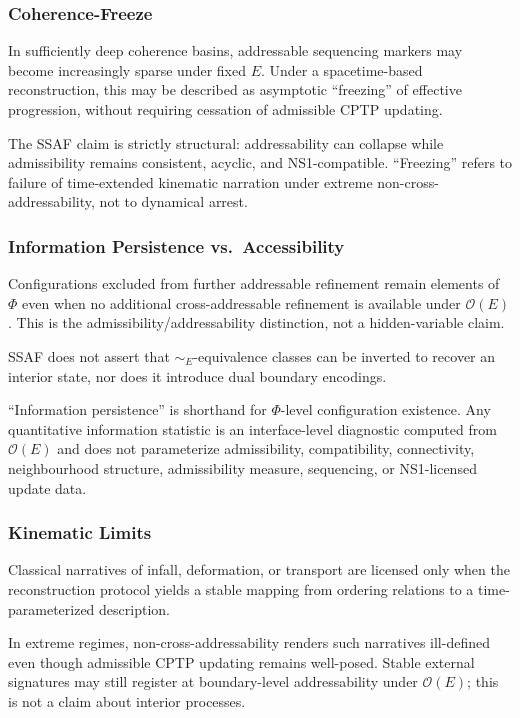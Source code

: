 \documentclass[aps,prx,onecolumn,11pt]{revtex4-2}
\theoremstyle{plain}
\theoremstyle{definition}
\theoremstyle{remark}
\begin{document}
\subsubsection{Coherence-Freeze}
\label{appB:coherence_freeze}

In sufficiently deep coherence basins, addressable sequencing markers
may become increasingly sparse under fixed \(E\). Under a spacetime-based
reconstruction, this may be described as asymptotic ``freezing'' of
effective progression, without requiring cessation of admissible CPTP
updating.

The SSAF claim is strictly structural: addressability can collapse while
admissibility remains consistent, acyclic, and NS1-compatible.
``Freezing'' refers to failure of time-extended kinematic narration
under extreme non-cross-addressability, not to dynamical arrest.

\subsubsection{Information Persistence vs.\ Accessibility}
\label{appB:info_persistence}

Configurations excluded from further addressable refinement remain
elements of \(\Phi\) even when no additional cross-addressable refinement
is available under \(\mathcal O(E)\). This is the
admissibility/addressability distinction, not a hidden-variable claim.

SSAF does not assert that \(\sim_E\)-equivalence classes can be inverted
to recover an interior state, nor does it introduce dual boundary
encodings.

``Information persistence'' is shorthand for \(\Phi\)-level
configuration existence. Any quantitative information statistic is an
interface-level diagnostic computed from \(\mathcal O(E)\) and does not
parameterize admissibility, compatibility, connectivity, neighbourhood
structure, admissibility measure, sequencing, or NS1-licensed update
data.

\subsubsection{Kinematic Limits}
\label{appB:kinematic_limits}

Classical narratives of infall, deformation, or transport are licensed
only when the reconstruction protocol yields a stable mapping from
ordering relations to a time-parameterized description.

In extreme regimes, non-cross-addressability renders such narratives
ill-defined even though admissible CPTP updating remains well-posed.
Stable external signatures may still register at boundary-level
addressability under \(\mathcal O(E)\); this is not a claim about
interior processes.
\end{document}
